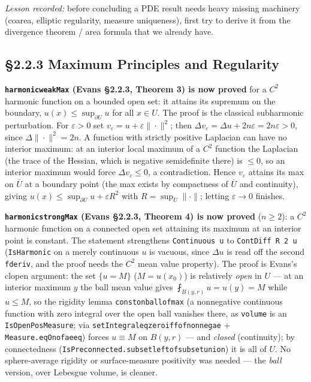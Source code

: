 ﻿\documentclass[12pt, a4paper]{article}
\renewcommand{\_}{\origunderscore\allowbreak}
\theoremstyle{definition}
\theoremstyle{plain}
\begin{document}
\emph{Lesson recorded:} before concluding a PDE result needs heavy missing machinery (coarea,
elliptic regularity, measure uniqueness), first try to derive it from the divergence theorem /
area formula that we already have.

\subsection{§2.2.3 Maximum Principles and Regularity}

\textbf{\texttt{harmonic\_weakMax} (Evans §2.2.3, Theorem 3) is now proved} for a $C^2$
harmonic function on a bounded open set: it attains its supremum on the boundary,
$u(x) \le \sup_{\partial U} u$ for all $x \in U$. The proof is the classical subharmonic
perturbation. For $\varepsilon > 0$ set $v_\varepsilon = u + \varepsilon\|\cdot\|^2$; then
$\Delta v_\varepsilon = \Delta u + 2n\varepsilon = 2n\varepsilon > 0$, since
$\Delta\|\cdot\|^2 = 2n$. A function with strictly positive Laplacian can have no interior
maximum: at an interior local maximum of a $C^2$ function the Laplacian (the trace of the
Hessian, which is negative semidefinite there) is $\le 0$, so an interior maximum would force
$\Delta v_\varepsilon \le 0$, a contradiction. Hence $v_\varepsilon$
attains its max on $\overline U$ at a boundary point (the max exists by compactness of
$\overline U$ and continuity), giving $u(x) \le \sup_{\partial U} u + \varepsilon R^2$ with
$R = \sup_{\overline U}\|\cdot\|$; letting $\varepsilon \to 0$ finishes.

\textbf{\texttt{harmonic\_strongMax} (Evans §2.2.3, Theorem 4) is now proved} ($n \ge 2$): a $C^2$
harmonic function on a connected open set attaining its maximum at an interior point is constant.
The statement strengthens \texttt{Continuous u} to \texttt{ContDiff R 2 u} (\texttt{IsHarmonic} on a
merely continuous $u$ is vacuous, since $\Delta u$ is read off the second \texttt{fderiv}, and the
proof needs the $C^2$ mean value property). The proof is Evans's clopen argument: the set
$\{u = M\}$ ($M = u(x_0)$) is relatively \emph{open} in $U$ --- at an interior maximum $y$ the ball
mean value gives $\fint_{B(y,r)}u = u(y) = M$ while $u \le M$, so the rigidity lemma
\texttt{const\_on\_ball\_of\_max} (a nonnegative continuous function with zero integral over the open
ball vanishes there, as \texttt{volume} is an \texttt{IsOpenPosMeasure}; via
\texttt{setIntegral\_eq\_zero\_iff\_of\_nonneg\_ae} $+$ \texttt{Measure.eqOn\_of\_ae\_eq}) forces
$u \equiv M$ on $B(y,r)$ --- and \emph{closed} (continuity); by connectedness
(\texttt{IsPreconnected.subset\_left\_of\_subset\_union}) it is all of $U$. No sphere-average
rigidity or surface-measure positivity was needed --- the \emph{ball} version, over Lebesgue volume,
is cleaner.
\end{document}
